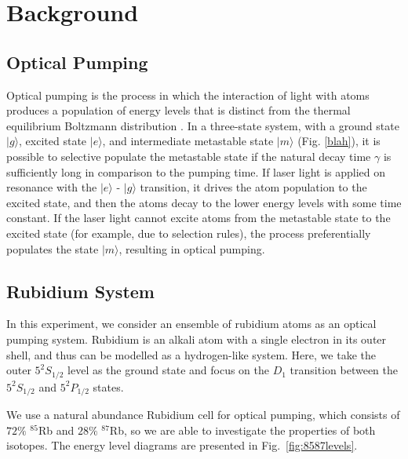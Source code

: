 
\section{Background}\label{background}

\subsection{Optical Pumping}

Optical pumping is the process in which the interaction of light with
atoms produces a population of energy levels that is distinct from the
thermal equilibrium Boltzmann distribution \cite{bernheim}. In a
three-state system, with a ground state $|g\rangle$, excited state
$|e\rangle$, and intermediate metastable state $|m\rangle$
(Fig. \ref{blah}), it is possible to selective populate the metastable
state if the natural decay time $\gamma$ is sufficiently long in
comparison to the pumping time. If laser light is applied on resonance
with the $|e\rangle$ - $|g\rangle$ transition, it drives the atom
population to the excited state, and then the atoms decay to the lower
energy levels with some time constant. If the laser light cannot
excite atoms from the metastable state to the excited state (for
example, due to selection rules), the process preferentially populates
the state $|m\rangle$, resulting in optical pumping.


\subsection{Rubidium System}

In this experiment, we consider an ensemble of rubidium atoms as an
optical pumping system. Rubidium is an alkali atom with a single
electron in its outer shell, and thus can be modelled as a
hydrogen-like system. Here, we take the outer $5^2S_{1/2}$ level as
the ground state and focus on the $D_1$ transition between the
$5^2S_{1/2}$ and $5^2P_{1/2}$ states. 

We use a natural abundance Rubidium cell for optical pumping, which
consists of $72\%$ $^{85}$Rb and $28\%$ $^{87}$Rb, so we are able to
investigate the properties of both isotopes. The energy level diagrams
are presented in Fig.~\ref{fig:8587levels}.


